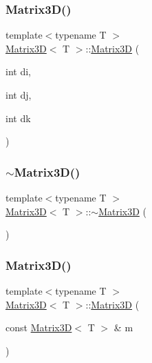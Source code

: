 \subsubsection{\texorpdfstring{Matrix3\+D()}{Matrix3D()}\hspace{0.1cm}{\footnotesize\ttfamily [2/3]}}
{\footnotesize\ttfamily template$<$typename T $>$ \\
\mbox{\hyperlink{classMatrix3D}{Matrix3D}}$<$ T $>$\+::\mbox{\hyperlink{classMatrix3D}{Matrix3D}} (\begin{DoxyParamCaption}\item[{int}]{di,  }\item[{int}]{dj,  }\item[{int}]{dk }\end{DoxyParamCaption})}

\mbox{\label{classMatrix3D_a7fda610223910a2b4dcfea445d2eb6c7}} 
\subsubsection{\texorpdfstring{$\sim$\+Matrix3\+D()}{~Matrix3D()}}
{\footnotesize\ttfamily template$<$typename T $>$ \\
\mbox{\hyperlink{classMatrix3D}{Matrix3D}}$<$ T $>$\+::$\sim$\mbox{\hyperlink{classMatrix3D}{Matrix3D}} (\begin{DoxyParamCaption}{ }\end{DoxyParamCaption})}

\mbox{\label{classMatrix3D_ae3fc93ef3456a36c92f8cbb7db01c3a9}} 
\subsubsection{\texorpdfstring{Matrix3\+D()}{Matrix3D()}\hspace{0.1cm}{\footnotesize\ttfamily [3/3]}}
{\footnotesize\ttfamily template$<$typename T $>$ \\
\mbox{\hyperlink{classMatrix3D}{Matrix3D}}$<$ T $>$\+::\mbox{\hyperlink{classMatrix3D}{Matrix3D}} (\begin{DoxyParamCaption}\item[{const \mbox{\hyperlink{classMatrix3D}{Matrix3D}}$<$ T $>$ \&}]{m }\end{DoxyParamCaption})}



